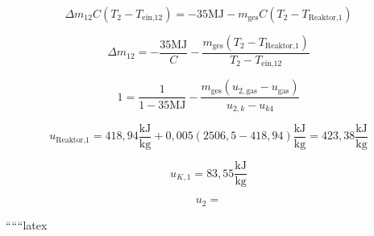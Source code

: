 \[
\Delta m_{12} C \left( T_2 - T_{\text{ein,12}} \right) = -35 \text{MJ} - m_{\text{ges}} C \left( T_2 - T_{\text{Reaktor,1}} \right)
\]

\[
\Delta m_{12} = -\frac{35 \text{MJ}}{C} - \frac{m_{\text{ges}} \left( T_2 - T_{\text{Reaktor,1}} \right)}{T_2 - T_{\text{ein,12}}}
\]

\[
1 = \frac{1}{1 - 35 \text{MJ}} - \frac{m_{\text{ges}} \left( u_{2,\text{gas}} - u_{\text{gas}} \right)}{u_{2,k} - u_{k4}}
\]

\[
u_{\text{Reaktor,1}} = 418,94 \frac{\text{kJ}}{\text{kg}} + 0,005 \left( 2506,5 - 418,94 \right) \frac{\text{kJ}}{\text{kg}} = 423,38 \frac{\text{kJ}}{\text{kg}}
\]

\[
u_{K,1} = 83,55 \frac{\text{kJ}}{\text{kg}}
\]

\[
u_2 =
\]

``````latex